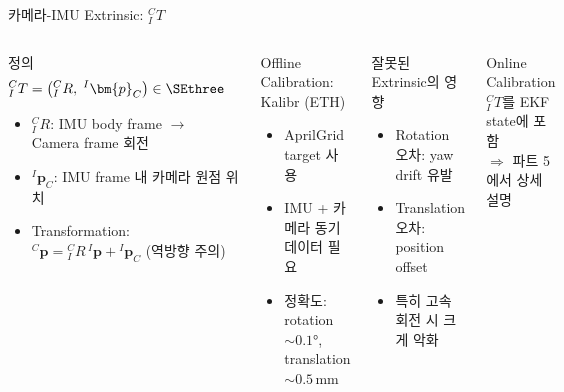 \begin{frame}[shrink=20]{카메라-IMU Extrinsic: ${}^C_I T$}
  \begin{columns}[T]
      \begin{block}{정의}
        \begin{align*}
          {}^C_I T &= \bigl({}^C_I R,\; {}^I\bm{p}_C\bigr) \in \SEthree
        \end{align*}
        \begin{itemize}
          \item ${}^C_I R$: IMU body frame $\to$ Camera frame 회전
          \item ${}^I\bm{p}_C$: IMU frame 내 카메라 원점 위치
          \item Transformation: ${}^C\bm{p} = {}^C_I R\,{}^I\bm{p} + {}^I\bm{p}_C$ (역방향 주의)
        \end{itemize}
      \end{block}
      \begin{block}{Offline Calibration: Kalibr (ETH)}
        \begin{itemize}
          \item AprilGrid target 사용
          \item IMU + 카메라 동기 데이터 필요
          \item 정확도: rotation $\sim 0.1°$, translation $\sim 0.5\,\text{mm}$
        \end{itemize}
      \end{block}
      \begin{alertblock}{잘못된 Extrinsic의 영향}
        \begin{itemize}
          \item Rotation 오차: yaw drift 유발
          \item Translation 오차: position offset
          \item 특히 고속 회전 시 크게 악화
        \end{itemize}
      \end{alertblock}
      \begin{exampleblock}{Online Calibration}
        ${}^C_I T$를 EKF state에 포함\\
        $\Rightarrow$ 파트 5에서 상세 설명
      \end{exampleblock}
  \end{columns}
\end{frame}

